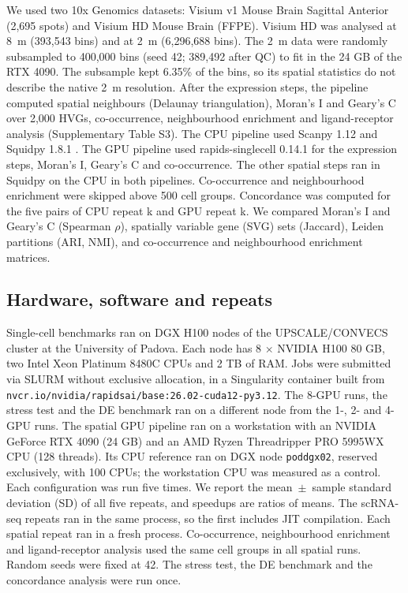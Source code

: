 \documentclass[runningheads]{llncs}
\begin{document}
We used two 10x Genomics datasets: Visium v1 Mouse Brain Sagittal Anterior (2,695 spots) and Visium HD Mouse Brain (FFPE).
Visium HD was analysed at 8~\textmu{}m (393,543 bins) and at 2~\textmu{}m (6,296,688 bins).
The 2~\textmu{}m data were randomly subsampled to 400,000 bins (seed 42; 389,492 after QC) to fit in the 24 GB of the RTX 4090.
The subsample kept 6.35\% of the bins, so its spatial statistics do not describe the native 2~\textmu{}m resolution.
After the expression steps, the pipeline computed spatial neighbours (Delaunay triangulation), Moran's I and Geary's C over 2,000 HVGs, co-occurrence, neighbourhood enrichment and ligand-receptor analysis (Supplementary Table S3).
The CPU pipeline used Scanpy 1.12 and Squidpy 1.8.1 \cite{Palla2022}.
The GPU pipeline used rapids-singlecell 0.14.1 for the expression steps, Moran's I, Geary's C and co-occurrence.
The other spatial steps ran in Squidpy on the CPU in both pipelines.
Co-occurrence and neighbourhood enrichment were skipped above 500 cell groups.
Concordance was computed for the five pairs of CPU repeat k and GPU repeat k.
We compared Moran's I and Geary's C (Spearman $\rho$), spatially variable gene (SVG) sets (Jaccard), Leiden partitions (ARI, NMI), and co-occurrence and neighbourhood enrichment matrices.

\hypertarget{hardware-software-and-repeats}{%
\subsection{Hardware, software and repeats}\label{hardware-software-and-repeats}}

Single-cell benchmarks ran on DGX H100 nodes of the UPSCALE/CONVECS cluster at the University of Padova.
Each node has 8 $\times$ NVIDIA H100 80 GB, two Intel Xeon Platinum 8480C CPUs and 2 TB of RAM.
Jobs were submitted via SLURM without exclusive allocation, in a Singularity container built from \nolinkurl{nvcr.io/nvidia/rapidsai/base:26.02-cuda12-py3.12}.
The 8-GPU runs, the stress test and the DE benchmark ran on a different node from the 1-, 2- and 4-GPU runs.
The spatial GPU pipeline ran on a workstation with an NVIDIA GeForce RTX 4090 (24 GB) and an AMD Ryzen Threadripper PRO 5995WX CPU (128 threads).
Its CPU reference ran on DGX node \texttt{poddgx02}, reserved exclusively, with 100 CPUs; the workstation CPU was measured as a control.
Each configuration was run five times.
We report the mean~$\pm$~sample standard deviation (SD) of all five repeats, and speedups are ratios of means.
The scRNA-seq repeats ran in the same process, so the first includes JIT compilation.
Each spatial repeat ran in a fresh process.
Co-occurrence, neighbourhood enrichment and ligand-receptor analysis used the same cell groups in all spatial runs.
Random seeds were fixed at 42.
The stress test, the DE benchmark and the concordance analysis were run once.
\end{document}
